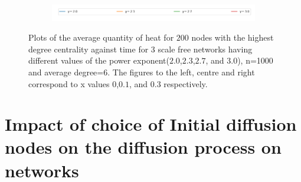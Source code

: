 \documentclass[10pt,a4paper]{article}
\begin{document}
\begin{figure}[!h]
\begin{subfigure}[b]{0.32\textwidth}
     	\end{subfigure} \\
     	\begin{subfigure}[b]{0.80\textwidth}
     		\includegraphics[width= \textwidth]{images/legend-gamma.png}
     	\end{subfigure}
     	\caption{Plots of the average quantity of heat for $200$ nodes with the highest degree centrality against time for $3$ scale free networks having different values of the power exponent($2.0$,$2.3$,$2.7$, and $3.0$), n=1000 and average degree=$6$. The figures to the left, centre and right correspond to x values $0$,$0.1$, and $0.3$ respectively.}
     	\label{quantity-exponents}
     \end{figure}
 
     \section{Impact of choice of Initial diffusion nodes on the diffusion process on networks}
     
\end{document}
